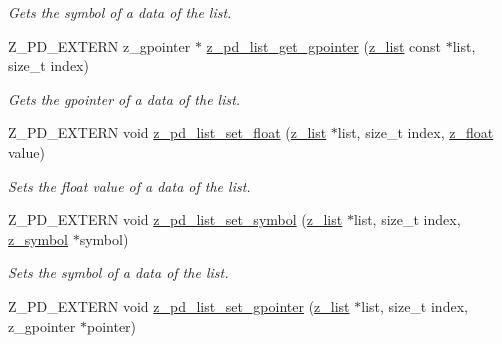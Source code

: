 \begin{DoxyCompactItemize}
\begin{DoxyCompactList}\small\item\em Gets the symbol of a data of the list. \end{DoxyCompactList}\item 
\hypertarget{group__zpd_ga0a79895856b9caf2205214f0bb5099cb}{Z\-\_\-\-P\-D\-\_\-\-E\-X\-T\-E\-R\-N z\-\_\-gpointer $\ast$ \hyperlink{group__zpd_ga0a79895856b9caf2205214f0bb5099cb}{z\-\_\-pd\-\_\-list\-\_\-get\-\_\-gpointer} (\hyperlink{struct__list}{z\-\_\-list} const $\ast$list, size\-\_\-t index)}\label{group__zpd_ga0a79895856b9caf2205214f0bb5099cb}

\begin{DoxyCompactList}\small\item\em Gets the gpointer of a data of the list. \end{DoxyCompactList}\item 
\hypertarget{group__zpd_ga52a19c872e23370e4e8da05f191c8c34}{Z\-\_\-\-P\-D\-\_\-\-E\-X\-T\-E\-R\-N void \hyperlink{group__zpd_ga52a19c872e23370e4e8da05f191c8c34}{z\-\_\-pd\-\_\-list\-\_\-set\-\_\-float} (\hyperlink{struct__list}{z\-\_\-list} $\ast$list, size\-\_\-t index, \hyperlink{group__zpd_ga86e16508ee69192343f6f6ad26fcef55}{z\-\_\-float} value)}\label{group__zpd_ga52a19c872e23370e4e8da05f191c8c34}

\begin{DoxyCompactList}\small\item\em Sets the float value of a data of the list. \end{DoxyCompactList}\item 
\hypertarget{group__zpd_ga15a877a477bb80a28a56516dd2d39b18}{Z\-\_\-\-P\-D\-\_\-\-E\-X\-T\-E\-R\-N void \hyperlink{group__zpd_ga15a877a477bb80a28a56516dd2d39b18}{z\-\_\-pd\-\_\-list\-\_\-set\-\_\-symbol} (\hyperlink{struct__list}{z\-\_\-list} $\ast$list, size\-\_\-t index, \hyperlink{group__zpd_ga43e609e9bccc7a2018b8f16558b9494c}{z\-\_\-symbol} $\ast$symbol)}\label{group__zpd_ga15a877a477bb80a28a56516dd2d39b18}

\begin{DoxyCompactList}\small\item\em Sets the symbol of a data of the list. \end{DoxyCompactList}\item 
\hypertarget{group__zpd_gadf2b20a2a1023bb1971a2402d02ef4cb}{Z\-\_\-\-P\-D\-\_\-\-E\-X\-T\-E\-R\-N void \hyperlink{group__zpd_gadf2b20a2a1023bb1971a2402d02ef4cb}{z\-\_\-pd\-\_\-list\-\_\-set\-\_\-gpointer} (\hyperlink{struct__list}{z\-\_\-list} $\ast$list, size\-\_\-t index, z\-\_\-gpointer $\ast$pointer)}\label{group__zpd_gadf2b20a2a1023bb1971a2402d02ef4cb}


\end{DoxyCompactItemize}
